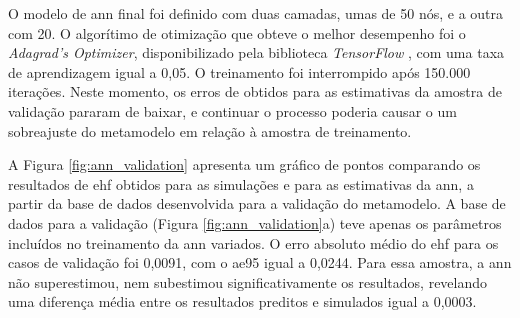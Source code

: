 O modelo de \acrshort{ann} final foi definido com duas camadas, umas de 50 nós, e a outra com 20. 
O algorítimo de otimização que obteve o melhor desempenho foi o \textit{Adagrad's Optimizer}, disponibilizado pela biblioteca \textit{TensorFlow} \cite{tensorflow2015}, com uma taxa de aprendizagem igual a 0,05. O treinamento foi interrompido após 150.000 iterações. Neste momento, os erros de obtidos para as estimativas da amostra de validação pararam de baixar, e continuar o processo poderia causar o um sobreajuste do metamodelo em relação à amostra de treinamento.

A Figura \ref{fig:ann_validation} apresenta um gráfico de pontos comparando os resultados de \acrshort{ehf} obtidos para as simulações e para as estimativas da \acrshort{ann}, a partir da base de dados desenvolvida para a validação do metamodelo. A base de dados para a validação (Figura \ref{fig:ann_validation}a) teve apenas os parâmetros incluídos no treinamento da \acrshort{ann} variados. 
O erro absoluto médio do \acrshort{ehf} para os casos de validação foi 0,0091, com o \acrshort{ae95} igual a 0,0244.
Para essa amostra, a \acrshort{ann} não superestimou, nem subestimou significativamente os resultados, revelando uma diferença média entre os resultados preditos e simulados igual a 0,0003.

